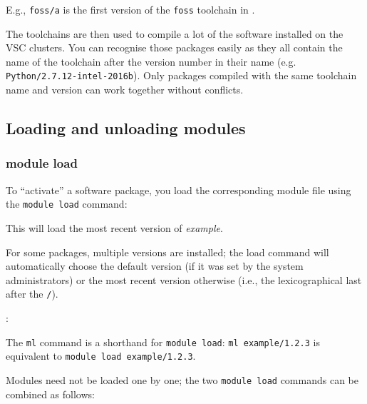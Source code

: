 E.g., \texttt{foss/\the\year{}a} is the first version of the \lstinline|foss| toolchain in \the\year.

The toolchains are then used to compile a lot of the software installed on
the VSC clusters. You can recognise those packages easily as they all contain the
name of the toolchain after the version number in their name (e.g. \lstinline|Python/2.7.12-intel-2016b|).
Only packages compiled with the same toolchain name and version can work together without conflicts.

\subsection{Loading and unloading modules}
\label{subsec:activating-and-deactivating-modules}

\subsubsection{module load}

To ``activate'' a software package, you load the corresponding module file
using the \lstinline|module load| command:

\begin{prompt}
\end{prompt}

This will load the most recent version of \emph{example}.

For some packages, multiple versions are installed; the load
command will automatically choose the default version (if it was set by the
system administrators) or the most recent version otherwise (i.e., the
lexicographical last after the \lstinline|/|).

:

\begin{prompt}
\end{prompt}

\ifusinglmod
The \lstinline|ml| command is a shorthand for \lstinline|module load|:
\lstinline|ml example/1.2.3| is equivalent to \lstinline|module load example/1.2.3|.
\fi

Modules need not be loaded one by one; the two \lstinline|module load| commands can be
combined as follows:

\begin{prompt}
\end{prompt}

